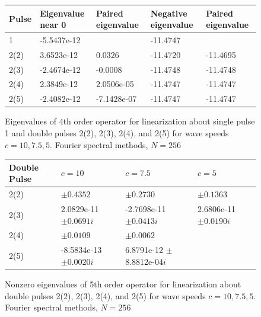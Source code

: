 \documentclass[12pt]{article}
\begin{document}
\begin{figure}[H]
\begin{tabular}{l|ll|ll}
Pulse  & Eigenvalue near 0  & Paired eigenvalue & Negative eigenvalue & Paired eigenvalue \\ \hline
1      & -5.5437e-12        &                   & -11.4747            &                   \\
2(2)   & 3.6523e-12         & 0.0326            & -11.4720            & -11.4695          \\
2(3)   & -2.4674e-12        & -0.0008           & -11.4748            & -11.4748          \\
2(4)   & 2.3849e-12         & 2.0506e-05        & -11.4747            & -11.4747          \\
2(5)   & -2.4082e-12        & -7.1428e-07       & -11.4747            & -11.4747          \\
\end{tabular}
\caption{Eigenvalues of 4th order operator for linearization about single pulse 1 and double pulses 2(2), 2(3), 2(4), and 2(5) for wave speeds $c = 10, 7.5, 5$. Fourier spectral methods, $N = 256$}
\end{figure}


\begin{figure}[H]
\begin{tabular}{l|lll}
 Double Pulse   & $c = 10$            & $c=7.5$                         & $c=5$        \\ \hline
  2(2) &     $\pm 0.4352$             & $\pm 0.2730$                    & $\pm 0.1363$ \\ 
  2(3) &     2.0829e-11 $\pm 0.0691i$ & -2.7698e-11 $\pm 0.0413i$       & 2.6806e-11 $\pm 0.0190i$\\ 
  2(4) &     $\pm 0.0109$             & $\pm 0.0062$                    & \\ 
  2(5) &    -8.5834e-13 $\pm 0.0020i$ & 6.8791e-12 $\pm$ 8.8812e-04$i$  & \\
\end{tabular}
\caption{Nonzero eigenvalues of 5th order operator for linearization about double pulses 2(2), 2(3), 2(4), and 2(5) for wave speeds $c = 10, 7.5, 5$. Fourier spectral methods, $N = 256$}
\end{figure}
\end{document}
